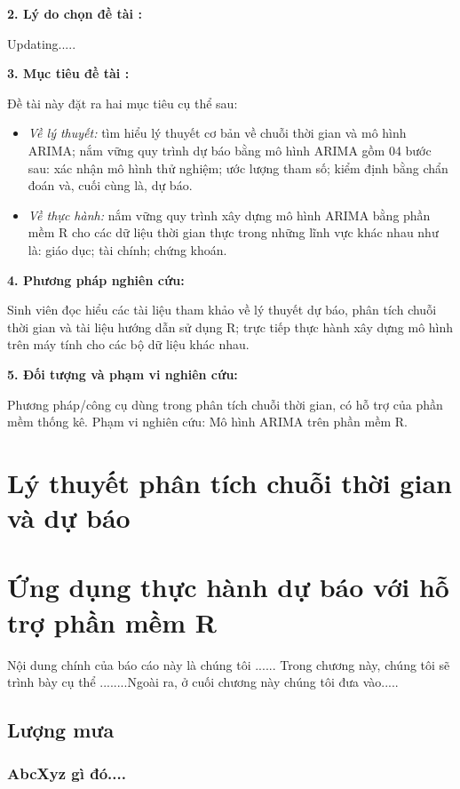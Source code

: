 \documentclass[12pt, a4paper,oneside]{book}
\theoremstyle{definition}
\begin{document}
\noindent 
{\bf 2. Lý do chọn đề tài :}

Updating.....

\noindent 
{\bf 3. Mục tiêu đề tài :}

Đề tài này đặt ra hai mục tiêu cụ thể sau:
\begin{itemize}
	\item \textit{Về lý thuyết:} tìm hiểu lý thuyết cơ bản về chuỗi thời gian và mô hình ARIMA; nắm vững quy trình dự báo bằng mô hình ARIMA gồm 04 bước sau: xác nhận mô hình thử nghiệm; ước lượng tham số; kiểm định bằng chẩn đoán và, cuối cùng là, dự báo.
	
	\item \textit{Về thực hành:} nắm vững quy trình xây dựng mô hình ARIMA bằng phần mềm R cho các dữ liệu thời gian thực trong những lĩnh vực khác nhau như là: giáo dục; tài chính; chứng khoán.
\end{itemize}


\noindent 
{\bf 4. Phương pháp nghiên cứu:}

Sinh viên đọc hiểu các tài liệu tham khảo về lý thuyết dự báo, phân tích chuỗi thời gian và tài liệu hướng dẫn sử dụng R; trực tiếp thực hành xây dựng mô hình trên máy tính cho các bộ dữ liệu khác nhau.

\noindent 
{\bf 5. Đối tượng và phạm vi nghiên cứu:}

Phương pháp/công cụ dùng trong phân tích chuỗi thời gian, có hỗ trợ của phần mềm thống kê. Phạm vi nghiên cứu:  Mô hình ARIMA trên phần mềm R.

\chapter{Lý thuyết phân tích chuỗi thời gian và dự báo}


\chapter{Ứng dụng thực hành dự báo với hỗ trợ phần mềm R}
Nội dung chính của báo cáo này là chúng tôi ...... Trong chương này, chúng tôi sẽ trình bày cụ thể ........Ngoài ra, ở cuối chương này chúng tôi đưa vào.....
\section{Lượng mưa}
\subsection{AbcXyz gì đó....}
\end{document}
